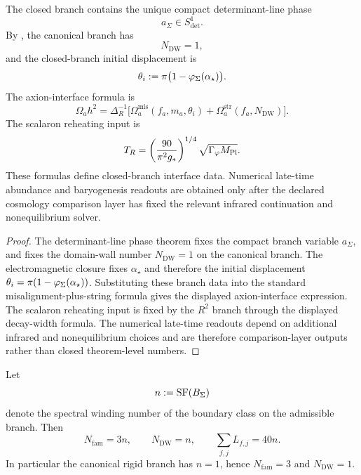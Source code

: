 \begin{theorem}
\label{thm:axion-seam-phase}
The closed branch contains the unique compact determinant-line phase
\[
a_\Sigma\in S^1_{\det}.
\]
By , the canonical branch has
\[
N_{\mathrm{DW}}=1,
\]
and the closed-branch initial displacement is
\[
\theta_i:=\pi\bigl(1-\varphi_{\Sigma}(\alpha_\star)\bigr).
\]
The axion-interface formula is
\[
\Omega_a h^2=
\Delta_R^{-1}
\bigl[
\Omega_a^{\mathrm{mis}}(f_a,m_a,\theta_i)
+
\Omega_a^{\mathrm{str}}(f_a,N_{\mathrm{DW}})
\bigr].
\]
The scalaron reheating input is
\[
T_R=
\left(\frac{90}{\pi^2 g_\ast}\right)^{1/4}
\sqrt{\Gamma_\varphi M_{\mathrm{Pl}}}.
\]
These formulas define closed-branch interface data. Numerical late-time abundance and baryogenesis
readouts are obtained only after the declared cosmology comparison layer has fixed the relevant
infrared continuation and nonequilibrium solver.
\end{theorem}

\begin{proof}
The determinant-line phase theorem fixes the compact branch variable $a_\Sigma$, and
 fixes the domain-wall number $N_{\mathrm{DW}}=1$ on the
canonical branch. The electromagnetic closure fixes $\alpha_\star$ and therefore the initial
displacement $\theta_i=\pi(1-\varphi_{\Sigma}(\alpha_\star))$. Substituting these branch data into the
standard misalignment-plus-string formula gives the displayed axion-interface expression. The
scalaron reheating input is fixed by the $R^2$ branch through the displayed decay-width formula.
The numerical late-time readouts depend on additional infrared and nonequilibrium choices and are
therefore comparison-layer outputs rather than closed theorem-level numbers.
\end{proof}

\begin{theorem}
\label{thm:boundary-winding-control}
Let
\[
n:=\operatorname{SF}(B_\Sigma)
\]
denote the spectral winding number of the boundary class on the admissible branch. Then
\[
N_{\mathrm{fam}}=3n,
\qquad
N_{\mathrm{DW}}=n,
\qquad
\sum_{f,j}L_{f,j}=40n.
\]
In particular the canonical rigid branch has $n=1$, hence $N_{\mathrm{fam}}=3$ and
$N_{\mathrm{DW}}=1$.
\end{theorem}

